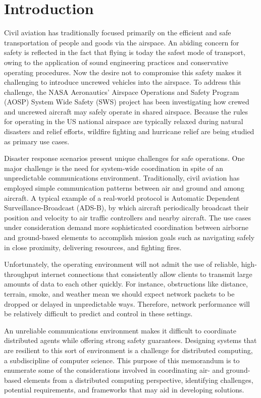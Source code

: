 \section{Introduction}
\label{sec:introduction}

Civil aviation has traditionally focused primarily on the efficient
and safe transportation of people and goods via the airspace. An
abiding concern for safety is reflected in the fact that flying is
today the safest mode of transport, owing to the application of sound
engineering practices and conservative operating procedures. Now the
desire not to compromise this safety makes it challenging to introduce
uncrewed vehicles into the airspace. To address this challenge, the
NASA Aeronautics' Airspace Operations and Safety Program (AOSP) System
Wide Safety (SWS) project has been investigating how crewed and
uncrewed aircraft may safely operate in shared airspace. Because the
rules for operating in the US national airspace are typically relaxed
during natural disasters and relief efforts, wildfire fighting and
hurricane relief are being studied as primary use cases.

Disaster response scenarios present unique challenges for safe
operations. One major challenge is the need for system-wide
coordination in spite of an unpredictable communications
environment. Traditionally, civil aviation has employed simple
communication patterns between air and ground and among aircraft. A
typical example of a real-world protocol is Automatic Dependent
Surveillance-Broadcast (ADS-B), by which aircraft periodically
broadcast their position and velocity to air traffic controllers and
nearby aircraft. The use cases under consideration demand more
sophisticated coordination between airborne and ground-based elements
to accomplish mission goals such as navigating safely in close
proximity, delivering resources, and fighting fires.

Unfortunately, the operating environment will not admit the use of
reliable, high-throughput internet connections that consistently allow
clients to transmit large amounts of data to each other quickly. For
instance, obstructions like distance, terrain, smoke, and weather mean
we should expect network packets to be dropped or delayed in
unpredictable ways. Therefore, network performance will be relatively
difficult to predict and control in these settings.

An unreliable communications environment makes it difficult to
coordinate distributed agents while offering strong safety
guarantees. Designing systems that are resilient to this sort of
environment is a challenge for distributed computing, a subdiscipline
of computer science. This purpose of this memorandum is to enumerate
some of the considerations involved in coordinating air- and
ground-based elements from a distributed computing perspective,
identifying challenges, potential requirements, and frameworks that
may aid in developing solutions.

